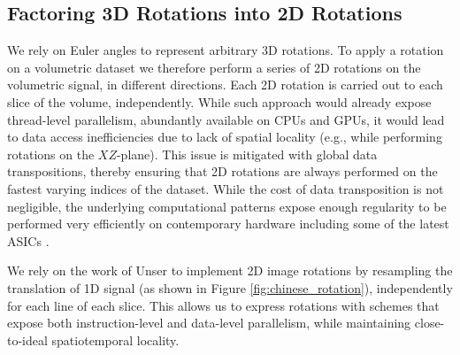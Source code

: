 \documentclass[]{usiinfbachelorproject}
\begin{document}
	\subsection{Factoring 3D Rotations into 2D Rotations}
	We rely on Euler angles to represent arbitrary 3D rotations. To apply a rotation on a volumetric dataset we therefore perform a series of 2D rotations on the volumetric signal, in different directions. Each 2D rotation is carried out to each slice of the volume, independently. While such approach would already expose thread-level parallelism, abundantly available on CPUs and GPUs, it would lead to data access inefficiencies due to lack of spatial locality (e.g., while performing rotations on the $XZ$-plane). This issue is mitigated with global data transpositions, thereby ensuring that 2D rotations are always performed on the fastest varying indices of the dataset. While the cost of data transposition is not negligible, the underlying computational patterns expose enough regularity to be performed very efficiently on contemporary hardware including some of the latest ASICs \cite{neuralengine}.
	
	
	
	
	We rely on the work of Unser \cite{main_article} to implement 2D image rotations by resampling the translation of 1D signal (as shown in Figure \ref{fig:chinese_rotation}), independently for each line of each slice. This allows us to express rotations with schemes that expose both instruction-level and data-level parallelism, while maintaining close-to-ideal spatiotemporal locality.
	
	
\end{document}
